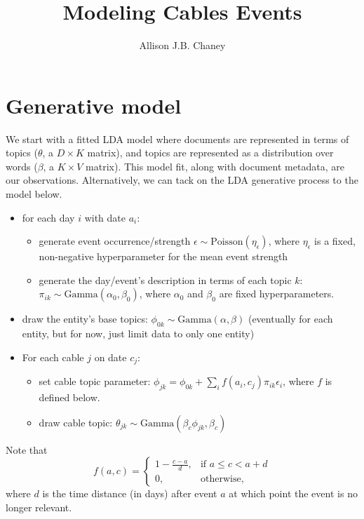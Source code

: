 





\title{Modeling Cables Events}

\author{Allison J.B. Chaney}

\maketitle

\section{Generative model} We start with a fitted LDA model where documents
are represented in terms of topics ($\theta$, a $D \times K$ matrix), and
topics are represented as a distribution over words ($\beta$, a $K \times V$
matrix).  This model fit, along with document metadata, are our observations.
Alternatively, we can tack on the LDA generative process to the model below.

\begin{itemize}
\item for each day $i$ with date $a_i$:
\begin{itemize}
\item generate event occurrence/strength $\epsilon \sim \mbox{Poisson}
(\eta_\epsilon)$, where $\eta_\epsilon$ is a fixed, non-negative
hyperparameter for the mean event strength
\item generate the day/event's description in terms of each topic $k$: $\pi_{ik} \sim \mbox{Gamma}(\alpha_0, \beta_0)$, where $\alpha_0$ and $\beta_0$ are fixed hyperparameters.
\end{itemize}
\item draw the entity's base topics: $\phi_{0k} \sim \mbox{Gamma}(\alpha, \beta)$ (eventually for each entity, but for now, just limit data to only one entity)
\item For each cable $j$ on date $c_j$:
\begin{itemize}
	\item set cable topic parameter: $\phi_{jk} = \phi_{0k} + \sum_i f(a_i, c_j) \pi_{ik} \epsilon_i$, where $f$ is defined below.
	\item draw cable topic: $\theta_{jk} \sim \mbox{Gamma}(\beta_c \phi_{jk}, \beta_c)$
\end{itemize}
\end{itemize}

\noindent Note that\[f(a, c) =
\begin{cases}
	1 - \frac{c-a}{d}, & \mbox{if } a \le c < a+d \\
	0, & \mbox{otherwise,}
\end{cases} \]
where $d$ is the time distance (in days) after event $a$ at which point the event is no longer relevant.


